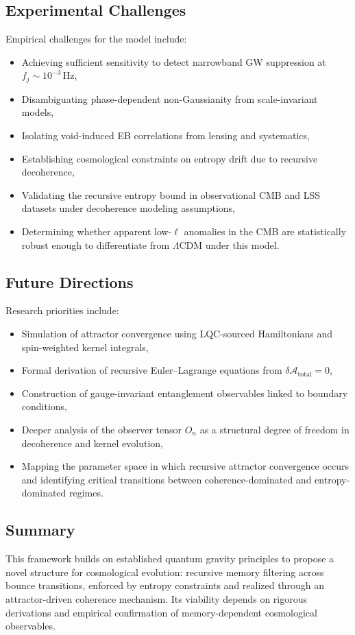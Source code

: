 \subsection{Experimental Challenges}

Empirical challenges for the model include:
\begin{itemize}
    \item Achieving sufficient sensitivity to detect narrowband GW suppression at \( f_j \sim 10^{-3} \,\text{Hz} \),
    \item Disambiguating phase-dependent non-Gaussianity from scale-invariant models,
    \item Isolating void-induced EB correlations from lensing and systematics,
    \item Establishing cosmological constraints on entropy drift due to recursive decoherence,
    \item Validating the recursive entropy bound in observational CMB and LSS datasets under decoherence modeling assumptions,
    \item Determining whether apparent low-\( \ell \) anomalies in the CMB are statistically robust enough to differentiate from $\Lambda$CDM under this model.
\end{itemize}

\subsection{Future Directions}

Research priorities include:
\begin{itemize}
    \item Simulation of attractor convergence using LQC-sourced Hamiltonians and spin-weighted kernel integrals,
    \item Formal derivation of recursive Euler–Lagrange equations from \( \delta \mathcal{A}_{\text{total}} = 0 \),
    \item Construction of gauge-invariant entanglement observables linked to boundary conditions,
    \item Deeper analysis of the observer tensor \( O_n \) as a structural degree of freedom in decoherence and kernel evolution,
    \item Mapping the parameter space in which recursive attractor convergence occurs and identifying critical transitions between coherence-dominated and entropy-dominated regimes.
\end{itemize}

\subsection{Summary}

This framework builds on established quantum gravity principles to propose a novel structure for cosmological evolution: recursive memory filtering across bounce transitions, enforced by entropy constraints and realized through an attractor-driven coherence mechanism. Its viability depends on rigorous derivations and empirical confirmation of memory-dependent cosmological observables.
